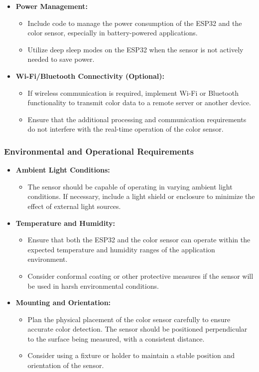 \begin{itemize}
	\item \textbf{Power Management:}
	\begin{itemize}
		\item Include code to manage the power consumption of the ESP32 and the color sensor, especially in battery-powered applications.
		\item Utilize deep sleep modes on the ESP32 when the sensor is not actively needed to save power.
	\end{itemize}
	
	\item \textbf{Wi-Fi/Bluetooth Connectivity (Optional):}
	\begin{itemize}
		\item If wireless communication is required, implement Wi-Fi or Bluetooth functionality to transmit color data to a remote server or another device.
		\item Ensure that the additional processing and communication requirements do not interfere with the real-time operation of the color sensor.
	\end{itemize}
\end{itemize}

\subsubsection*{Environmental and Operational Requirements}

\begin{itemize}
	\item \textbf{Ambient Light Conditions:}
	\begin{itemize}
		\item The sensor should be capable of operating in varying ambient light conditions. If necessary, include a light shield or enclosure to minimize the effect of external light sources.
	\end{itemize}
	
	\item \textbf{Temperature and Humidity:}
	\begin{itemize}
		\item Ensure that both the ESP32 and the color sensor can operate within the expected temperature and humidity ranges of the application environment.
		\item Consider conformal coating or other protective measures if the sensor will be used in harsh environmental conditions.
	\end{itemize}
	
	\item \textbf{Mounting and Orientation:}
	\begin{itemize}
		\item Plan the physical placement of the color sensor carefully to ensure accurate color detection. The sensor should be positioned perpendicular to the surface being measured, with a consistent distance.
		\item Consider using a fixture or holder to maintain a stable position and orientation of the sensor.
	\end{itemize}
\end{itemize}

